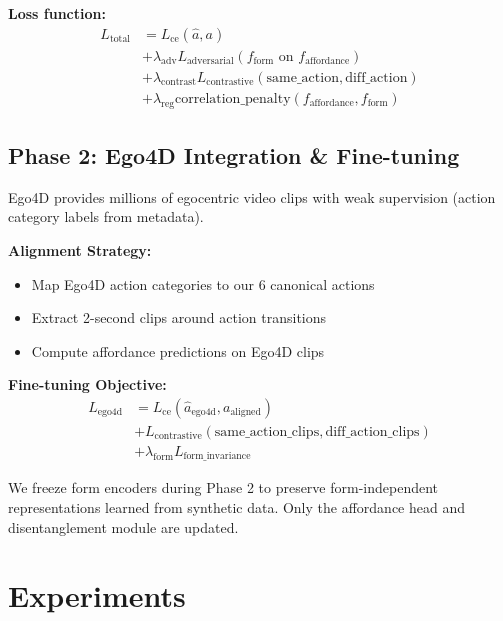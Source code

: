\documentclass[11pt]{article}
\begin{document}
\textbf{Loss function:}
\begin{equation}
\begin{split}
L_{\text{total}} &= L_{\text{ce}}(\hat{a}, a) \\
&+ \lambda_{\text{adv}} L_{\text{adversarial}}(f_{\text{form}} \text{ on } f_{\text{affordance}}) \\
&+ \lambda_{\text{contrast}} L_{\text{contrastive}}(\text{same\_action}, \text{diff\_action}) \\
&+ \lambda_{\text{reg}} \text{correlation\_penalty}(f_{\text{affordance}}, f_{\text{form}})
\end{split}
\end{equation}

\subsection{Phase 2: Ego4D Integration \& Fine-tuning}

Ego4D provides millions of egocentric video clips with weak supervision (action category labels from metadata).

\textbf{Alignment Strategy:}
\begin{itemize}
    \item Map Ego4D action categories to our 6 canonical actions
    \item Extract 2-second clips around action transitions
    \item Compute affordance predictions on Ego4D clips
\end{itemize}

\textbf{Fine-tuning Objective:}
\begin{equation}
\begin{split}
L_{\text{ego4d}} &= L_{\text{ce}}(\hat{a}_{\text{ego4d}}, a_{\text{aligned}}) \\
&+ L_{\text{contrastive}}(\text{same\_action\_clips}, \text{diff\_action\_clips}) \\
&+ \lambda_{\text{form}} L_{\text{form\_invariance}}
\end{split}
\end{equation}

We freeze form encoders during Phase 2 to preserve form-independent representations learned from synthetic data. Only the affordance head and disentanglement module are updated.

\section{Experiments}
\end{document}
